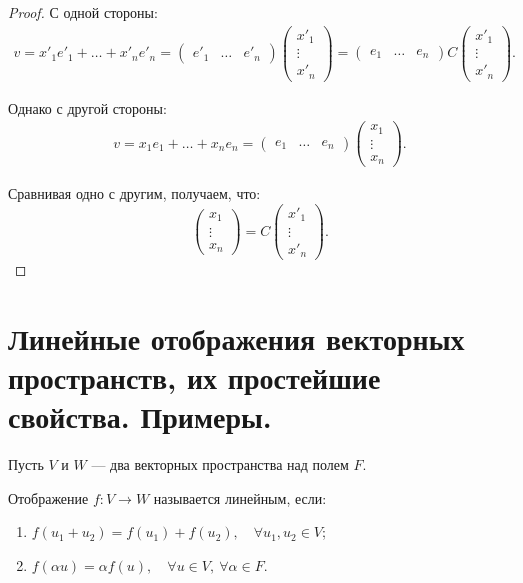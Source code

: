 \begin{proof}
С одной стороны:
\begin{gather*}
v = x'_1 e'_1 + \ldots + x'_ne'_n = 
\begin{pmatrix*}
e'_1 & \ldots & e'_n
\end{pmatrix*} 
\begin{pmatrix*}
x'_1 \\
\vdots \\
x'_n
\end{pmatrix*} = 
\begin{pmatrix*}
e_1 & \ldots & e_n
\end{pmatrix*} C
\begin{pmatrix*}
x'_1 \\
\vdots \\
x'_n
\end{pmatrix*}.
\end{gather*}

Однако с другой стороны:
\begin{gather*}
v = x_1e_1 + \ldots + x_ne_n = 
\begin{pmatrix*}
e_1 & \ldots & e_n
\end{pmatrix*}
\begin{pmatrix*}
x_1 \\
\vdots \\
x_n
\end{pmatrix*}.
\end{gather*}

Сравнивая одно с другим, получаем, что:
\[
\begin{pmatrix*}
x_1 \\
\vdots \\
x_n
\end{pmatrix*} = C
\begin{pmatrix*}
x'_1 \\
\vdots \\
x'_n
\end{pmatrix*}.
\]
\end{proof}

\section{Линейные отображения векторных пространств, их простейшие свойства. Примеры.}

Пусть $V$ и $W$ --- два векторных пространства над полем $F$.

\begin{Def}
Отображение $f : V \rightarrow W$ называется линейным, если:
\begin{enumerate}
\item $f(u_1 + u_2) = f(u_1) + f(u_2), \quad \forall u_1, u_2 \in V$;
\item $f(\alpha u) = \alpha f(u), \quad \forall u \in V,\ \forall \alpha \in F$.
\end{enumerate}
\end{Def}


